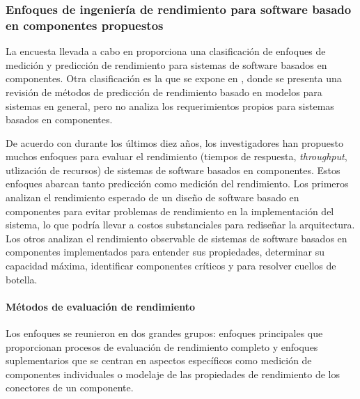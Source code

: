 \subsubsection{Enfoques de ingeniería de rendimiento para software basado en componentes propuestos}
La encuesta llevada a cabo en \cite{Koziolek:2010:PEC:1808359.1808729} proporciona una clasificación de enfoques de medición y predicción de rendimiento para sistemas de software basados en componentes. Otra clasificación es la que se expone en \cite{1291833}, donde se presenta una revisión de métodos de predicción de rendimiento basado en modelos para sistemas en general, pero no analiza los requerimientos propios para sistemas basados en componentes. 

De acuerdo con \cite{Koziolek:2010:PEC:1808359.1808729} durante los últimos diez años, los investigadores han propuesto muchos enfoques para evaluar el rendimiento (tiempos de respuesta, \emph{throughput}, utlización de recursos) de sistemas de software basados en componentes. Estos enfoques abarcan tanto predicción como medición del rendimiento. Los primeros analizan el rendimiento esperado de un diseño de software basado en componentes para evitar problemas de rendimiento en la implementación del sistema, lo que podría llevar a costos substanciales para rediseñar la arquitectura. Los otros analizan el rendimiento observable de sistemas de software basados en componentes implementados para entender sus propiedades, determinar su capacidad máxima, identificar componentes críticos y para resolver cuellos de botella.

\paragraph{Métodos de evaluación de rendimiento}
Los enfoques se reunieron en dos grandes grupos: enfoques principales que proporcionan procesos de evaluación de rendimiento completo y enfoques suplementarios que se centran en aspectos específicos como medición de componentes individuales o modelaje de las propiedades de rendimiento de los conectores de un componente.

